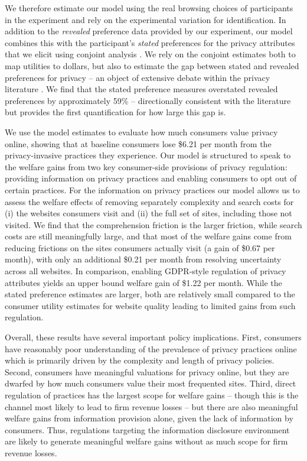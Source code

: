 \documentclass[12pt]{article}
\theoremstyle{definition}
\theoremstyle{remark}
\begin{document}
{We therefore estimate our model using the real browsing choices of participants in the experiment and rely on the experimental variation for identification. In addition to the \textit{revealed} preference data provided by our experiment, our model combines this with the participant's \textit{stated} preferences for the privacy attributes that we elicit using conjoint analysis \citep{ALLENBY2019151}. We rely on the conjoint estimates both to map utilities to dollars, but also to estimate the gap between stated and revealed preferences for privacy -- an object of extensive debate within the privacy literature \citep{norberg2007privacy, f4d6c48d-b77c-3568-b51c-5946aee2b9de, athey2025digital}. We find that the stated preference measures overstated revealed preferences by approximately 59\% -- directionally consistent with the literature but provides the first quantification for how large this gap is.

We use the model estimates to evaluate how much consumers value privacy online, showing that at baseline consumers lose \$6.21 per month from the privacy-invasive practices they experience. Our model is structured to speak to the welfare gains from two key consumer-side provisions of privacy regulation: providing information on privacy practices and enabling consumers to opt out of certain practices. For the information on privacy practices our model allows us to assess the welfare effects of removing separately complexity and search costs for (i) the websites consumers visit and (ii) the full set of sites, including those not visited. We find that the comprehension friction is the larger friction, while search costs are still meaningfully large, and that most of the welfare gains come from reducing frictions on the sites consumers actually visit (a gain of \$0.67 per month), with only an additional \$0.21 per month from resolving uncertainty across all websites. In comparison, enabling GDPR-style regulation of privacy attributes yields an upper bound welfare gain of \$1.22 per month. While the stated preference estimates are larger, both are relatively small compared to the consumer utility estimates for website quality leading to limited gains from such regulation.

Overall, these results have several important policy implications. First, consumers have reasonably poor understanding of the prevalence of privacy practices online which is primarily driven by the complexity and length of privacy policies. Second, consumers have meaningful valuations for privacy online, but they are dwarfed by how much consumers value their most frequented sites. Third, direct regulation of practices has the largest scope for welfare gains -- though this is the channel most likely to lead to firm revenue losses -- but there are also meaningful welfare gains from information provision alone, given the lack of information by consumers. Thus, regulations targeting the information disclosure environment are likely to generate meaningful welfare gains without as much scope for firm revenue losses.}
\end{document}
